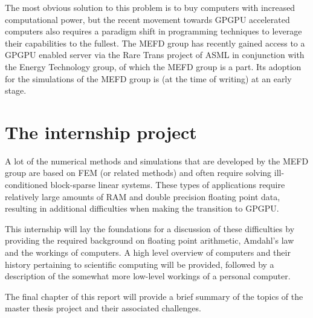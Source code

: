 The most obvious solution to this problem is to buy computers with increased computational power, but the recent movement towards GPGPU accelerated computers also requires a paradigm shift in programming techniques to leverage their capabilities to the fullest. The MEFD group has recently gained access to a GPGPU enabled server via the Rare Trans project of ASML in conjunction with the Energy Technology group, of which the MEFD group is a part. Its adoption for the simulations of the MEFD group is (at the time of writing) at an early stage.

\newpage

\section{The internship project}

\hspace{5mm}A lot of the numerical methods and simulations that are developed by the MEFD group are based on FEM (or related methods) and often require solving ill-conditioned block-sparse linear systems. These types of applications require relatively large amounts of RAM and double precision floating point data, resulting in additional difficulties when making the transition to GPGPU.\vspace{4mm}

This internship will lay the foundations for a discussion of these difficulties by providing the required background on floating point arithmetic, Amdahl's law and the workings of computers. A high level overview of computers and their history pertaining to scientific computing will be provided, followed by a description of the somewhat more low-level workings of a personal computer. \vspace{4mm}

The final chapter of this report will provide a brief summary of the topics of the master thesis project and their associated challenges.